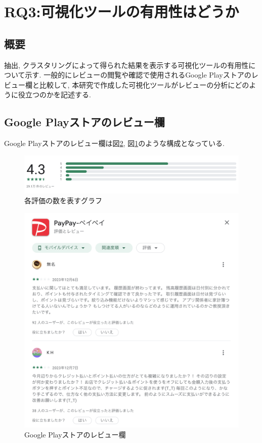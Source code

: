 
\section{RQ3:可視化ツールの有用性はどうか}
\subsection{概要}
抽出, クラスタリングによって得られた結果を表示する可視化ツールの有用性について示す. 一般的にレビューの閲覧や確認で使用されるGoogle Playストアのレビュー欄と比較して, 本研究で作成した可視化ツールがレビューの分析にどのように役立つのかを記述する. 

\subsection{Google Playストアのレビュー欄}
Google Playストアのレビュー欄は図\ref{fig:google_play}, 図\ref{fig:google_play_graph}のような構成となっている. 

\begin{figure}[H]
  \centering
  \includegraphics[scale=0.4]
    {contents/images/google_play_graph.png}
  \caption{各評価の数を表すグラフ\label{fig:google_play_graph}}
\end{figure}

\begin{figure}[H]
  \centering
  \includegraphics[scale=0.4]
    {contents/images/google_play.png}
  \caption{Google Playストアのレビュー欄\label{fig:google_play}}
\end{figure}

